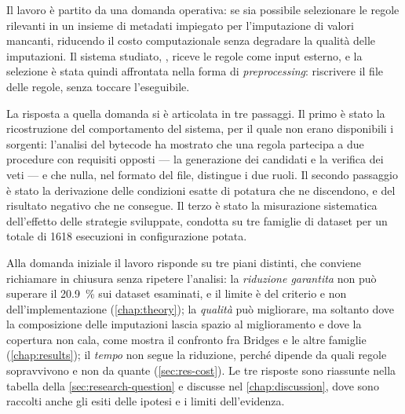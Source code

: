 \newpage\pagestyle{conclusions}

\label{chap:conclusions}


Il lavoro è partito da una domanda operativa: se sia possibile selezionare le regole rilevanti in
un insieme di metadati impiegato per l'imputazione di valori mancanti, riducendo il costo
computazionale senza degradare la qualità delle imputazioni. Il sistema studiato, \renuver{},
riceve le regole come input esterno, e la selezione è stata quindi affrontata nella forma di
\emph{preprocessing}: riscrivere il file delle regole, senza toccare l'eseguibile.

La risposta a quella domanda si è articolata in tre passaggi. Il primo è stato la ricostruzione
del comportamento del sistema, per il quale non erano disponibili i sorgenti: l'analisi del
bytecode ha mostrato che una regola partecipa a due procedure con requisiti opposti --- la
generazione dei candidati e la verifica dei veti --- e che nulla, nel formato del file, distingue
i due ruoli. Il secondo passaggio è stato la derivazione delle condizioni esatte di potatura che
ne discendono, e del risultato negativo che ne consegue. Il terzo è stato la misurazione
sistematica dell'effetto delle strategie sviluppate, condotta su tre famiglie di dataset per un
totale di \num{1618} esecuzioni in configurazione potata.

Alla domanda iniziale il lavoro risponde su tre piani distinti, che conviene richiamare in chiusura
senza ripetere l'analisi: la \emph{riduzione garantita} non può superare il \SI{20.9}{\percent}
sui dataset esaminati, e il limite è del criterio e non dell'implementazione
(\autoref{chap:theory}); la \emph{qualità} può migliorare, ma soltanto dove la composizione delle
imputazioni lascia spazio al miglioramento e dove la copertura non cala, come mostra il confronto
fra Bridges e le altre famiglie (\autoref{chap:results}); il \emph{tempo} non segue la riduzione,
perché dipende da quali regole sopravvivono e non da quante (\autoref{sec:res-cost}). Le tre
risposte sono riassunte nella tabella della \autoref{sec:research-question} e discusse nel
\autoref{chap:discussion}, dove sono raccolti anche gli esiti delle ipotesi e i limiti
dell'evidenza.

\label{sec:future-work}

